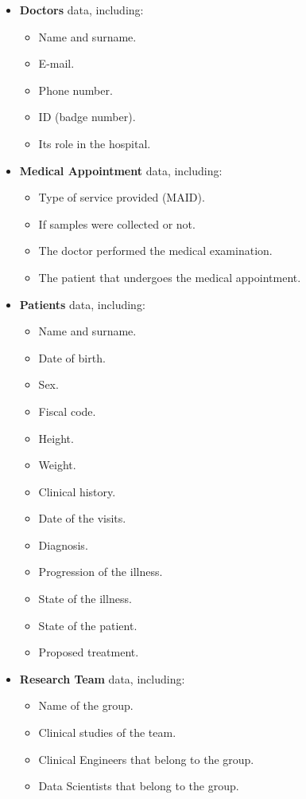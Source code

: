 \begin{itemize}
    \item \textbf{Doctors} data, including:
    \begin{itemize}
        \item Name and surname.
        \item E-mail.
        \item Phone number.
        \item ID (badge number).
        \item Its role in the hospital.        
    \end{itemize}
    
    \item \textbf{Medical Appointment} data, including:
    \begin{itemize}
        \item Type of service provided (MAID).
        \item If samples were collected or not.
        \item The doctor performed the medical examination.
        \item The patient that undergoes the medical appointment.
    \end{itemize}
    
    \item \textbf{Patients} data, including:
    \begin{itemize}
        \item Name and surname.
        \item Date of birth.
        \item Sex.
        \item Fiscal code.  
        \item Height.  
        \item Weight.  
        \item Clinical history.
        \item Date of the visits. 
        \item Diagnosis.
        \item Progression of the illness.  
        \item State of the illness.
        \item State of the patient.
        \item Proposed treatment. 
    \end{itemize}

    \item \textbf{Research Team} data, including:
    \begin{itemize}
        \item Name of the group.
        \item Clinical studies of the team.
        \item Clinical Engineers that belong to the group.
        \item Data Scientists that belong to the group.
    \end{itemize}


\end{itemize}
